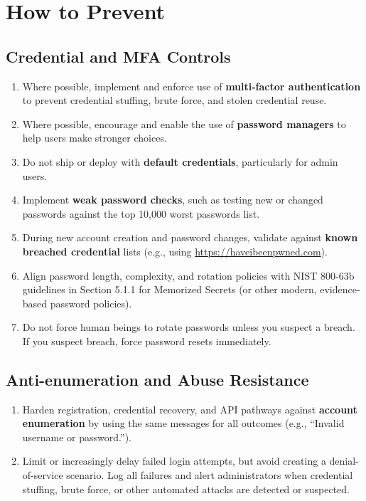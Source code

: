 \documentclass[11pt]{article}
\begin{document}
\section{How to Prevent}

\subsection{Credential and MFA Controls}
\begin{enumerate}
  \item Where possible, implement and enforce use of \textbf{multi-factor authentication} to prevent credential stuffing, brute force, and stolen credential reuse.
  \item Where possible, encourage and enable the use of \textbf{password managers} to help users make stronger choices.
  \item Do not ship or deploy with \textbf{default credentials}, particularly for admin users.
  \item Implement \textbf{weak password checks}, such as testing new or changed passwords against the top 10{,}000 worst passwords list.
  \item During new account creation and password changes, validate against \textbf{known breached credential} lists (e.g., using \url{https://haveibeenpwned.com}).
  \item Align password length, complexity, and rotation policies with NIST 800-63b guidelines in Section 5.1.1 for Memorized Secrets (or other modern, evidence-based password policies).
  \item Do not force human beings to rotate passwords unless you suspect a breach. If you suspect breach, force password resets immediately.
\end{enumerate}

\subsection{Anti-enumeration and Abuse Resistance}
\begin{enumerate}[resume]
  \item Harden registration, credential recovery, and API pathways against \textbf{account enumeration} by using the same messages for all outcomes (e.g., ``Invalid username or password.'').
  \item Limit or increasingly delay failed login attempts, but avoid creating a denial-of-service scenario. Log all failures and alert administrators when credential stuffing, brute force, or other automated attacks are detected or suspected.
\end{enumerate}
\end{document}
